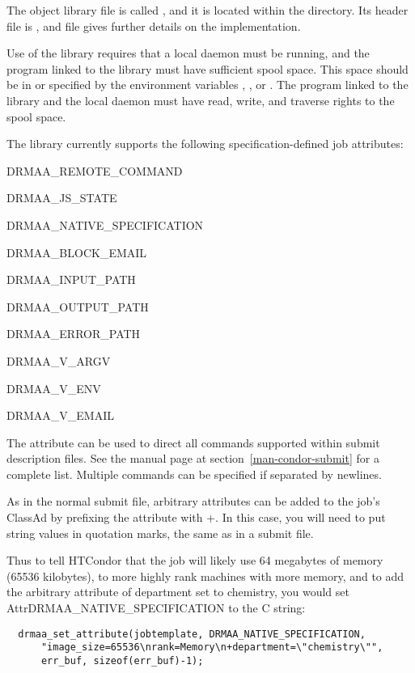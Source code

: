 The object library file is called ,
and it is located within the  directory.
Its header file  is , 
and file  
gives further details on the implementation.

Use of the library requires that a
local  daemon  must be running,
and the program linked to the library must have
sufficient spool space.
This space should be in 
or specified by the environment variables
, , or .
The program linked to the library and the local  daemon
must have read, write, and traverse rights to the spool space.

The library currently supports the following specification-defined
job attributes:
\begin{description}
\item{DRMAA\_REMOTE\_COMMAND}
\item{DRMAA\_JS\_STATE}
\item{DRMAA\_NATIVE\_SPECIFICATION}
\item{DRMAA\_BLOCK\_EMAIL}
\item{DRMAA\_INPUT\_PATH}
\item{DRMAA\_OUTPUT\_PATH}
\item{DRMAA\_ERROR\_PATH}
\item{DRMAA\_V\_ARGV}
\item{DRMAA\_V\_ENV}
\item{DRMAA\_V\_EMAIL}
\end{description}

The attribute  can be used
to direct all commands supported within
submit description files.  
See the  manual page at
section~\ref{man-condor-submit} for a complete list.
Multiple commands can be specified if separated by newlines.  

As in the normal submit file,
arbitrary attributes can be added to the job's ClassAd
by prefixing the attribute with +.  In this case, you will need to put
string values in quotation marks, the same as in a submit file.

Thus to tell HTCondor that the job will likely use 64 megabytes of memory (65536
kilobytes), to more highly rank machines with more memory, and to add the
arbitrary attribute of department set to chemistry, you would set
Attr{DRMAA\_NATIVE\_SPECIFICATION} to the C string:

\begin{verbatim}
  drmaa_set_attribute(jobtemplate, DRMAA_NATIVE_SPECIFICATION,
      "image_size=65536\nrank=Memory\n+department=\"chemistry\"",
      err_buf, sizeof(err_buf)-1);

\end{verbatim}

